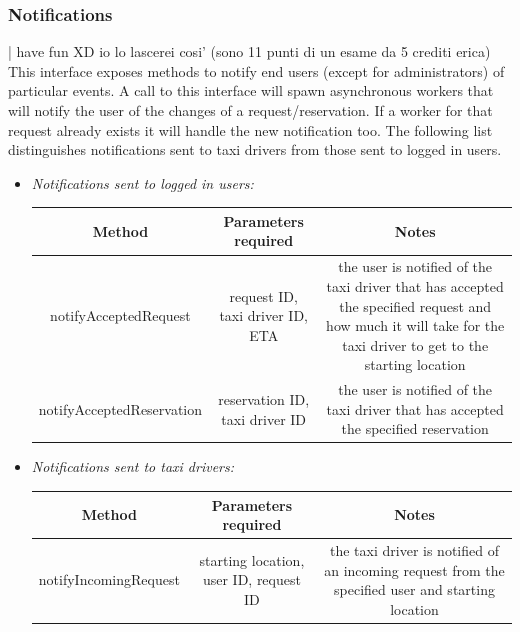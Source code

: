 \documentclass{article}
\begin{document}
\begin{itemize}
			\subsubsection{Notifications} %
 | have fun XD io lo lascerei cosi' (sono 11 punti di un esame da 5 crediti erica)
			This interface exposes methods to notify end users (except for administrators) of particular events. 
			A call to this interface will spawn asynchronous workers that will notify the user of the changes of a request/reservation.
			If a worker for that request already exists it will handle the new notification too.
			The following list distinguishes notifications sent to taxi drivers from those sent to logged in users.
			\begin{itemize}
				\item \textit{Notifications sent to logged in users:} \\
					\begin{adjustbox}{width=1.2\textwidth}	
						\begin{tabular}{*{3}{c}}
							\toprule
							Method & Parameters required & Notes \\
							\midrule
							notifyAcceptedRequest & request ID, taxi driver ID, ETA & the user is notified of the taxi driver that has accepted the specified request and how much it will take for the taxi driver to get to the starting location\\ 
							notifyAcceptedReservation & reservation ID, taxi driver ID & the user is notified of the taxi driver that has accepted the specified reservation \\
				\bottomrule
			\end{tabular}
		\end{adjustbox}	
	\item \textit{Notifications sent to taxi drivers:} \\
		\begin{adjustbox}{width=1.2\textwidth}	
			\begin{tabular}{*{3}{c}}
				\toprule
				Method & Parameters required & Notes \\
				\midrule
				notifyIncomingRequest & starting location, user ID, request ID & the taxi driver is notified of an incoming request from the specified user and starting location\\ 

\end{tabular}
\end{adjustbox}
\end{itemize}
\end{itemize}
\end{document}
